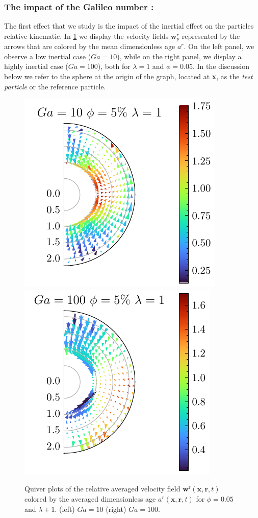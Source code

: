 \subsubsection*{The impact of the Galileo number :}
The first effect that we study is the impact of the inertial effect on the particles relative kinematic.  
In \ref{fig:Why_Ga_matter} we display the velocity fields $\textbf{w}_p^r$ represented by the arrows that are colored by the mean dimensionless age $a^r$.  
On the left panel, we observe a low inertial case ($Ga = 10$), while on the right panel, we display a highly inertial case ($Ga=100$), both for $\lambda =1$ and $\phi=0.05$.
In the discussion below we refer to the sphere at the origin of the graph, located at \textbf{x}, as the \textit{test particle} or the reference particle. 
\begin{figure}[h!]
    \centering
    \includegraphics[height=0.35\textwidth]{image/HOMOGENEOUS_NEW/Dist/U_rel_l_1_Ga_10_PHI_5.pdf}
    \includegraphics[height=0.35\textwidth]{image/HOMOGENEOUS_NEW/Dist/U_rel_l_1_Ga_100_PHI_5.pdf}
    \caption{
         Quiver plots of the relative averaged velocity field $\textbf{w}^\text{r}(\textbf{x},\textbf{r},t)$ colored by the averaged dimensionless age $a^r(\textbf{x},\textbf{r},t)$ for $\phi = 0.05$ and $\lambda +1$.
         (left) $Ga = 10$ (right) $Ga =100$. }
    \label{fig:Why_Ga_matter}
\end{figure}


